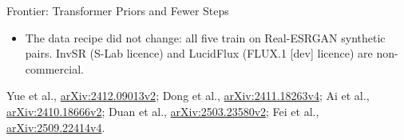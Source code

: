 \begin{frame}{Frontier: Transformer Priors and Fewer Steps}
  \begin{itemize}\footnotesize\itemsep0.25em
    \item The data recipe did not change: all five train on Real-ESRGAN synthetic pairs. InvSR (S-Lab licence) and LucidFlux (FLUX.1 [dev] licence) are non-commercial.
  \end{itemize}
  {\scriptsize Yue et al., \href{https://arxiv.org/abs/2412.09013v2}{arXiv:2412.09013v2}; Dong et al., \href{https://arxiv.org/abs/2411.18263v4}{arXiv:2411.18263v4}; Ai et al., \href{https://arxiv.org/abs/2410.18666v2}{arXiv:2410.18666v2}; Duan et al., \href{https://arxiv.org/abs/2503.23580v2}{arXiv:2503.23580v2}; Fei et al., \href{https://arxiv.org/abs/2509.22414v4}{arXiv:2509.22414v4}.\par}
\end{frame}

